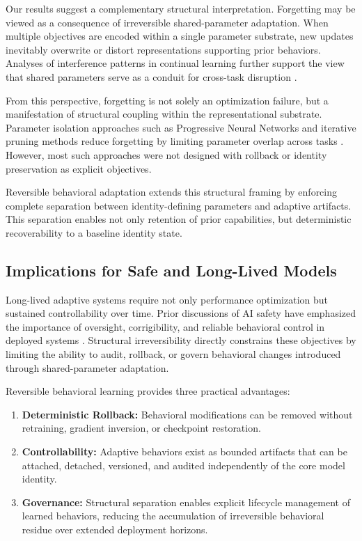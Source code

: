 \documentclass[10pt]{article}
\begin{document}
	Our results suggest a complementary structural interpretation. Forgetting may be viewed as a consequence of irreversible shared-parameter adaptation. When multiple objectives are encoded within a single parameter substrate, new updates inevitably overwrite or distort representations supporting prior behaviors. Analyses of interference patterns in continual learning further support the view that shared parameters serve as a conduit for cross-task disruption \cite{kaushik2021rmn}.
	
	From this perspective, forgetting is not solely an optimization failure, but a manifestation of structural coupling within the representational substrate. Parameter isolation approaches such as Progressive Neural Networks and iterative pruning methods reduce forgetting by limiting parameter overlap across tasks \cite{rusu2016progressive,mallya2018packnet}. However, most such approaches were not designed with rollback or identity preservation as explicit objectives.
	
	Reversible behavioral adaptation extends this structural framing by enforcing complete separation between identity-defining parameters and adaptive artifacts. This separation enables not only retention of prior capabilities, but deterministic recoverability to a baseline identity state.
	
	\subsection{Implications for Safe and Long-Lived Models}
	\label{sec:analysis_implications}
	
	Long-lived adaptive systems require not only performance optimization but sustained controllability over time. Prior discussions of AI safety have emphasized the importance of oversight, corrigibility, and reliable behavioral control in deployed systems \cite{amodei2016concrete}. Structural irreversibility directly constrains these objectives by limiting the ability to audit, rollback, or govern behavioral changes introduced through shared-parameter adaptation.
	
	Reversible behavioral learning provides three practical advantages:
	
	\begin{enumerate}
		\item \textbf{Deterministic Rollback:} Behavioral modifications can be removed without retraining, gradient inversion, or checkpoint restoration.
		\item \textbf{Controllability:} Adaptive behaviors exist as bounded artifacts that can be attached, detached, versioned, and audited independently of the core model identity.
		\item \textbf{Governance:} Structural separation enables explicit lifecycle management of learned behaviors, reducing the accumulation of irreversible behavioral residue over extended deployment horizons.
	\end{enumerate}
	
\end{document}
